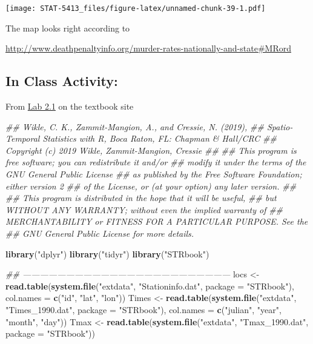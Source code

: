 \documentclass[]{book}
\newenvironment{Shaded}{\begin{snugshade}}{\end{snugshade}}
\newcommand{\CommentTok}[1]{\textcolor[rgb]{0.56,0.35,0.01}{\textit{#1}}}
\newcommand{\DataTypeTok}[1]{\textcolor[rgb]{0.13,0.29,0.53}{#1}}
\newcommand{\KeywordTok}[1]{\textcolor[rgb]{0.13,0.29,0.53}{\textbf{#1}}}
\newcommand{\NormalTok}[1]{#1}
\newcommand{\StringTok}[1]{\textcolor[rgb]{0.31,0.60,0.02}{#1}}
\begin{document}
\texttt{[image: STAT-5413\_files/figure-latex/unnamed-chunk-39-1.pdf]}

The map looks right according to

\url{http://www.deathpenaltyinfo.org/murder-rates-nationally-and-state\#MRord}

\hypertarget{in-class-activity}{%
\subsection{In Class Activity:}\label{in-class-activity}}

From \href{https://spacetimewithr.org/code}{Lab 2.1} on the textbook site

\begin{Shaded}
\begin{Highlighting}[]
\CommentTok{## Wikle, C. K., Zammit-Mangion, A., and Cressie, N. (2019), }
\CommentTok{## Spatio-Temporal Statistics with R, Boca Raton, FL: Chapman & Hall/CRC}
\CommentTok{## Copyright (c) 2019 Wikle, Zammit-Mangion, Cressie}
\CommentTok{##}
\CommentTok{## This program is free software; you can redistribute it and/or}
\CommentTok{## modify it under the terms of the GNU General Public License}
\CommentTok{## as published by the Free Software Foundation; either version 2}
\CommentTok{## of the License, or (at your option) any later version.}
\CommentTok{##}
\CommentTok{## This program is distributed in the hope that it will be useful,}
\CommentTok{## but WITHOUT ANY WARRANTY; without even the implied warranty of}
\CommentTok{## MERCHANTABILITY or FITNESS FOR A PARTICULAR PURPOSE.  See the}
\CommentTok{## GNU General Public License for more details.}

\KeywordTok{library}\NormalTok{(}\StringTok{"dplyr"}\NormalTok{)}
\KeywordTok{library}\NormalTok{(}\StringTok{"tidyr"}\NormalTok{)}
\KeywordTok{library}\NormalTok{(}\StringTok{"STRbook"}\NormalTok{)}

\CommentTok{## ------------------------------------------------------------------------}
\NormalTok{locs <-}\StringTok{ }\KeywordTok{read.table}\NormalTok{(}\KeywordTok{system.file}\NormalTok{(}\StringTok{"extdata"}\NormalTok{, }\StringTok{"Stationinfo.dat"}\NormalTok{,}
                               \DataTypeTok{package =} \StringTok{"STRbook"}\NormalTok{),}
                   \DataTypeTok{col.names =} \KeywordTok{c}\NormalTok{(}\StringTok{"id"}\NormalTok{, }\StringTok{"lat"}\NormalTok{, }\StringTok{"lon"}\NormalTok{))}
\NormalTok{Times <-}\StringTok{ }\KeywordTok{read.table}\NormalTok{(}\KeywordTok{system.file}\NormalTok{(}\StringTok{"extdata"}\NormalTok{, }\StringTok{"Times_1990.dat"}\NormalTok{,}
                                \DataTypeTok{package =} \StringTok{"STRbook"}\NormalTok{),}
                    \DataTypeTok{col.names =} \KeywordTok{c}\NormalTok{(}\StringTok{"julian"}\NormalTok{, }\StringTok{"year"}\NormalTok{, }\StringTok{"month"}\NormalTok{, }\StringTok{"day"}\NormalTok{))}
\NormalTok{Tmax <-}\StringTok{ }\KeywordTok{read.table}\NormalTok{(}\KeywordTok{system.file}\NormalTok{(}\StringTok{"extdata"}\NormalTok{, }\StringTok{"Tmax_1990.dat"}\NormalTok{,}
                               \DataTypeTok{package =} \StringTok{"STRbook"}\NormalTok{))}


\end{Highlighting}
\end{Shaded}
\end{document}
